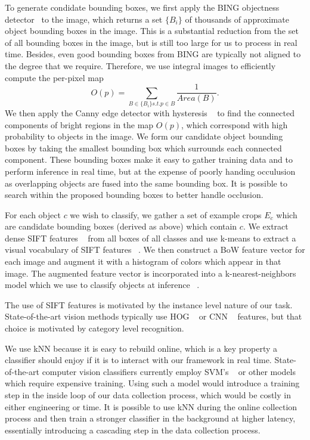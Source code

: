 \documentclass[conference]{IEEEtran}
\begin{document}
To generate condidate bounding boxes, we first apply the BING objectness detector~\citep{cheng14} to the image, which
returns a set $\{B_i\}$ of thousands of approximate object bounding boxes in the image. This is a
substantial reduction from the set of all bounding boxes in the image, but is still too large for
us to process in real time. Besides, even good bounding boxes from BING are typically not aligned to
the degree that we require. Therefore, we use integral images to efficiently compute the per-pixel map
$$O(p) = \sum_{B \in \{B_i\} s.t. p \in B} \frac{1}{Area(B)}.$$
We then apply the Canny edge detector with hysteresis ~\citep{} to find the connected components of bright
regions in the map $O(p)$, which correspond with high probability to objects in the image. We form
our candidate object bounding boxes by taking the smallest bounding box which surrounds each connected component.
These bounding boxes make it easy to gather training data and to perform inference in real time, but at
the expense of poorly handing occulusion as overlapping objects are fused into the same bounding box.
It is possible to search within the proposed bounding boxes to better handle occlusion.

For each object $c$ we wish to classify, we gather a set of example crops $E_c$ which are candidate
bounding boxes (derived as above) which contain $c$. We extract dense SIFT features ~\citep{} from all boxes of
all classes and use k-means to extract a visual vocabulary of SIFT features ~\citep{}. We then construct a
BoW feature vector for each image and augment it with a histogram of colors which appear in that image.
The augmented feature vector is incorporated into a k-nearest-neighbors model which we use to classify
objects at inference ~\citep{}.

The use of SIFT features is motivated by the instance level nature of our task. State-of-the-art vision
methods typically use HOG ~\citep{} or CNN ~\citep{} features, but that choice is motivated by category
level recognition.

We use kNN because it is easy to rebuild online, which is a key property a classifier should enjoy
if it is to interact with our framework in real time. State-of-the-art computer vision classifiers
currently employ SVM's ~\citep{} or other models which require expensive training. Using such a model would
introduce a training step in the inside loop of our data collection process, which would be costly
in either engineering or time.  It is possible to use kNN during the online collection process and then
train a stronger classifier in the background at higher latency, essentially introducing a cascading step
in the data collection process.
 
\end{document}

